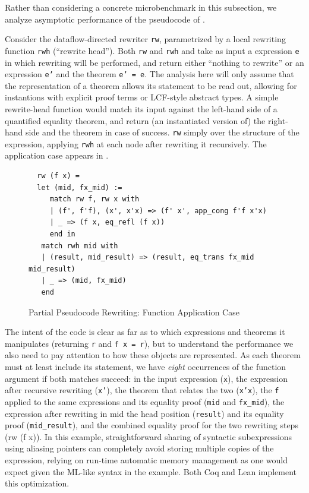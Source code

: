 \documentclass[sn-mathphys,pdflatex]{sn-jnl}%
\theoremstyle{thmstyleone}%
\theoremstyle{thmstyletwo}%
\theoremstyle{thmstylethree}%
\begin{document}
Rather than considering a concrete microbenchmark in this subsection, we analyze asymptotic performance of the pseudocode of .

Consider the dataflow-directed rewriter \texttt{rw}, parametrized by a local rewriting function \texttt{rwh} (``rewrite head'').
Both \texttt{rw} and \texttt{rwh} and take as input a expression \texttt{e} in which rewriting will be performed, and return either ``nothing to rewrite'' or an expression \texttt{e'} and the theorem \texttt{e' = e}.
The analysis here will only assume that the representation of a theorem allows its statement to be read out, allowing for instantions with explicit proof terms or LCF-style abstract types.
A simple rewrite-head function would match its input against the left-hand side of a quantified equality theorem, and return (an instantiated version of) the right-hand side and the theorem in case of success.
\texttt{rw} simply  over the structure of the expression, applying \texttt{rwh} at each node after rewriting it recursively.
The application case appears in .

\begin{figure}
\begin{verbatim}
  rw (f x) =
  let (mid, fx_mid) :=
     match rw f, rw x with
     | (f', f'f), (x', x'x) => (f' x', app_cong f'f x'x)
     | _ => (f x, eq_refl (f x))
     end in
   match rwh mid with
   | (result, mid_result) => (result, eq_trans fx_mid mid_result)
   | _ => (mid, fx_mid)
   end
\end{verbatim}
\caption{\label{fig:rw-app}Partial Pseudocode Rewriting: Function Application Case}
\end{figure}

The intent of the code is clear as far as to which expressions and theorems it manipulates (returning \texttt{r} and \texttt{f x = r}), but to understand the performance we also need to pay attention to how these objects are represented.
As each theorem must at least include its statement, we have \emph{eight} occurrences of the function argument if both matches succeed: in the input expression (\texttt{x}), the expression after recursive rewriting (\texttt{x'}), the theorem that relates the two (\texttt{x'x}), the \texttt{f} applied to the same expressions and its equality proof (\texttt{mid} and \texttt{fx_mid}), the expression after rewriting in mid the head position (\texttt{result}) and its equality proof (\texttt{mid_result}), and the combined equality proof for the two rewriting steps (rw (f x)).
In this example, straightforward sharing of syntactic subexpressions using aliasing pointers can completely avoid storing multiple copies of the expression, relying on run-time automatic memory management as one would expect given the ML-like syntax in the example.
Both Coq and Lean implement this optimization.
\end{document}
